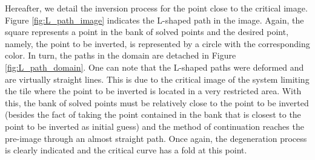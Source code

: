 \documentclass[journal=iecred,manuscript=article]{achemso}
\theoremstyle{definition}
\theoremstyle{remark}
\begin{document}
Hereafter, we detail the inversion process for the point close to the critical image. Figure \ref{fig:L_path_image} indicates the L-shaped path in the image. Again, the square represents a point in the bank of solved points and the desired point, namely, the point to be inverted, is represented by a circle with the corresponding color. In turn, the paths in the domain are detached in Figure \ref{fig:L_path_domain}. One can note that the L-shaped paths were deformed and are virtually straight lines. This is due to the critical image of the system limiting the tile where the point to be inverted is located in a very restricted area. With this, the bank of solved points must be relatively close to the point to be inverted (besides the fact of taking the point contained in the bank that is closest to the point to be inverted as initial guess) and the method of continuation reaches the pre-image through an almost straight path. Once again, the degeneration process is clearly indicated and the critical curve has a fold at this point.
\end{document}
